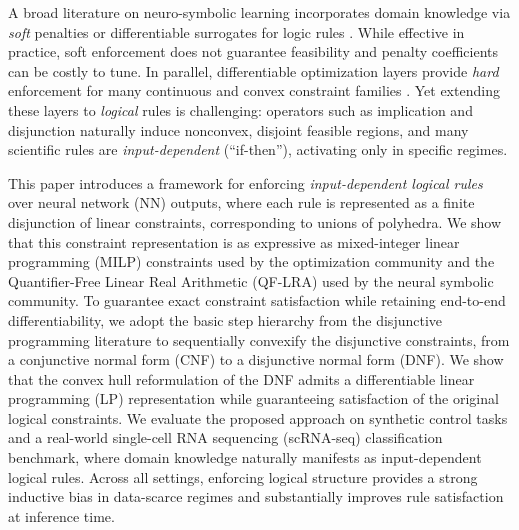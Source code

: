 \documentclass{article}
\theoremstyle{plain}
\theoremstyle{definition}
\theoremstyle{remark}
\begin{document}
A broad literature on neuro-symbolic learning incorporates domain knowledge via \emph{soft} penalties or differentiable surrogates for logic rules \citep{hu2020harnessingdeepneuralnetworks,xu2018semantic,wang2019satnetbridgingdeeplearning, manhaeve2018deepproblog,Giunchiglia_2022}. While effective in practice, soft enforcement does not guarantee feasibility and penalty coefficients can be costly to tune. In parallel, differentiable optimization layers provide \emph{hard} enforcement for many continuous and convex constraint families \citep{Amos2017,agrawal2019differentiable}. Yet extending these layers to \emph{logical} rules is challenging: operators such as implication and disjunction naturally induce nonconvex, disjoint feasible regions, and many scientific rules are \emph{input-dependent} (``if-then''), activating only in specific regimes. 

This paper introduces a framework for enforcing \emph{input-dependent logical rules} over neural network (NN) outputs, where each rule is represented as a finite disjunction of linear constraints, corresponding to unions of polyhedra. We show that this constraint representation is as expressive as mixed-integer linear programming (MILP) constraints used by the optimization community and the Quantifier-Free Linear Real Arithmetic (QF-LRA) used by the neural symbolic community. To guarantee exact constraint satisfaction while retaining end-to-end differentiability, we adopt the basic step hierarchy from the disjunctive programming literature \cite{balas2018disjunctive} to sequentially convexify the disjunctive constraints, from a conjunctive normal form (CNF) to a disjunctive normal form (DNF). We show that the convex hull reformulation of the DNF admits a differentiable linear programming (LP) representation while guaranteeing satisfaction of the original logical constraints. We evaluate the proposed approach on synthetic control tasks and a real-world single-cell RNA sequencing (scRNA-seq) classification benchmark, where domain knowledge naturally manifests as input-dependent logical rules. Across all settings, enforcing logical structure provides a strong inductive bias in data-scarce regimes and substantially improves rule satisfaction at inference time.


\end{document}
